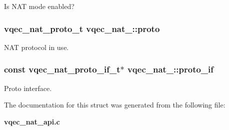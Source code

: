 Is NAT mode enabled? 
\subsubsection{\setlength{\rightskip}{0pt plus 5cm}vqec\_\-nat\_\-proto\_\-t \bf{vqec\_\-nat\_\-::proto}}\label{structvqec__nat___394d08a0cd65aef197b3a4fad65575b8}


NAT protocol in use. 
\subsubsection{\setlength{\rightskip}{0pt plus 5cm}const vqec\_\-nat\_\-proto\_\-if\_\-t$\ast$ \bf{vqec\_\-nat\_\-::proto\_\-if}}\label{structvqec__nat___03e8c964bd69b82dc5b736178e1637c4}


Proto interface. 

The documentation for this struct was generated from the following file:\begin{CompactItemize}
\item 
\bf{vqec\_\-nat\_\-api.c}\end{CompactItemize}
